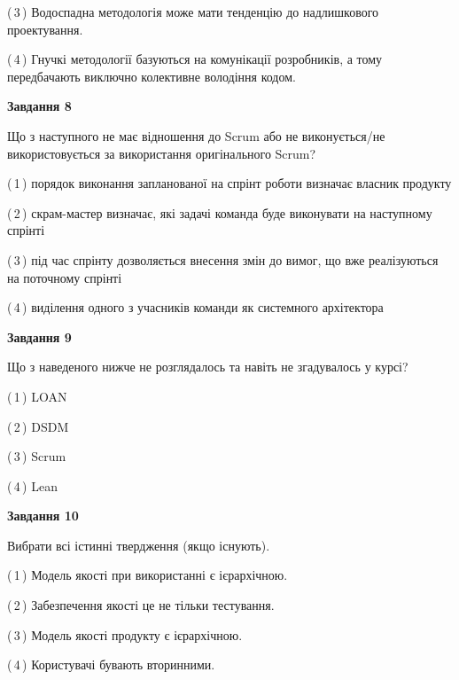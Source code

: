 \documentclass[10pt, ukrainian]{article}
\begin{document}
{\begin {large}
(\,3\,) Водоспадна методологія може мати тенденцію до надлишкового проектування. %



(\,4\,) Гнучкі методології базуються на комунікації розробників, а тому передбачають виключно колективне володіння кодом. %


{\begin {center}\textbf{Завдання 8}\end {center}}\par
Що з наступного не має відношення до Scrum або не виконується/не використовується за використання оригінального Scrum?\par
\vspace{2mm}



(\,1\,) порядок виконання запланованої на спрінт роботи визначає власник продукту%



(\,2\,) скрам-мастер визначає, які задачі команда буде виконувати на наступному спрінті%



(\,3\,) під час спрінту дозволяється внесення змін до вимог, що вже реалізуються на поточному спрінті%



(\,4\,) виділення одного з учасників команди як системного архітектора%


{\begin {center}\textbf{Завдання 9}\end {center}}\par
Що з наведеного нижче не розглядалось та навіть не згадувалось у курсі?\par
\vspace{2mm}



(\,1\,) LOAN%



(\,2\,) DSDM%



(\,3\,) Scrum%



(\,4\,) Lean%


{\begin {center}\textbf{Завдання 10}\end {center}}\par
Вибрати всі істинні твердження (якщо існують).\par
\vspace{2mm}



(\,1\,) Модель якості при використанні є ієрархічною.%



(\,2\,) Забезпечення якості це не тільки тестування.%



(\,3\,) Модель якості продукту є ієрархічною.%



(\,4\,) Користувачі бувають вторинними.%



\end {large}}
\end{document}
